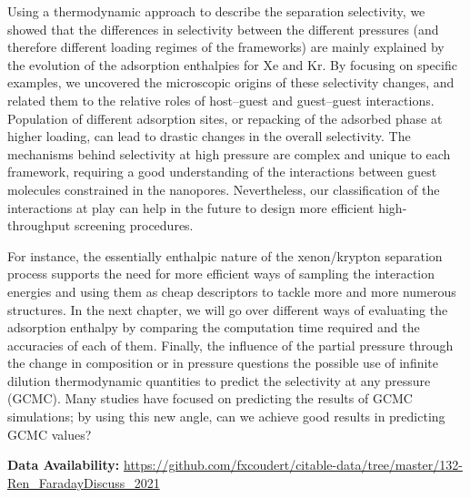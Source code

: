 \documentclass[main.tex]{subfiles}
\begin{document}
Using a thermodynamic approach to describe the separation selectivity, we showed that the differences in selectivity between the different pressures (and therefore different loading regimes of the frameworks) are mainly explained by the evolution of the adsorption enthalpies for Xe and Kr. By focusing on specific examples, we uncovered the microscopic origins of these selectivity changes, and related them to the relative roles of host--guest and guest--guest interactions. Population of different adsorption sites, or repacking of the adsorbed phase at higher loading, can lead to drastic changes in the overall selectivity. The mechanisms behind selectivity at high pressure are complex and unique to each framework, requiring a good understanding of the interactions between guest molecules constrained in the nanopores. Nevertheless, our classification of the interactions at play can help in the future to design more efficient high-throughput screening procedures.

For instance, the essentially enthalpic nature of the xenon/krypton separation process supports the need for more efficient ways of sampling the interaction energies and using them as cheap descriptors to tackle more and more numerous structures. In the next chapter, we will go over different ways of evaluating the adsorption enthalpy by comparing the computation time required and the accuracies of each of them. Finally, the influence of the partial pressure through the change in composition or in pressure questions the possible use of infinite dilution thermodynamic quantities to predict the selectivity at any pressure (GCMC). Many studies have focused on predicting the results of GCMC simulations;\cite{Simon_2015,Shi_2023,Kang_2023,Li_2023} by using this new angle, can we achieve good results in predicting GCMC values?

\textbf{Data Availability:} \url{https://github.com/fxcoudert/citable-data/tree/master/132-Ren_FaradayDiscuss_2021}

\OnlyInSubfile{\printglobalbibliography}
\end{document}
